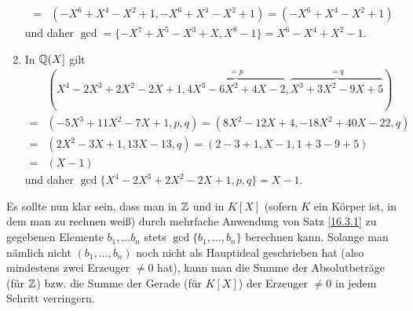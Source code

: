 \documentclass[../../main.tex]{subfiles}
\begin{document}
\begin{bsp}
\begin{enumerate}[\normalfont(a)]
\begin{align*}
=&(-X^6+X^4-X^2+1,-X^6+X^4-X^2+1)=(-X^6+X^4-X^2+1)
\end{align*}
und daher $\gcd=\{-X^7+X^5-X^3+X,X^8-1\}=X^6-X^4+X^2-1$.
\item In $\mathbb Q(X]$ gilt
\begin{align*}
&(X^4-2X^3+2X^2-2X+1,\overbrace{4X^3-6X^2+4X-2}^{=p},\overbrace{X^3+3X^2-9X+5}^{=q})\\
=&(-5X^3+11X^2-7X+1,p,q)=(8X^2-12X+4, -18X^2+40X-22,q)\\
=&(2X^2-3X+1,13X-13,q)=(2-3+1,X-1,1+3-9+5)\\
=&(X-1)
\end{align*}
und daher $\gcd\{X^4-2X^3+2X^2-2X+1,p,q\}=X-1$.
\end{enumerate}
\end{bsp}

\noindent Es sollte nun klar sein, dass man in $\mathbb Z$ und in $K[X]$ (sofern $K$ ein Körper ist, in dem man zu rechnen weiß) durch mehrfache Anwendung von Satz \ref{16.3.1} zu gegebenen Elemente $b_1,...b_n$ stets $\gcd\{b_1,...,b_n\}$ berechnen kann. Solange man nämlich nicht $(b_1,...,b_n)$ noch nicht als Hauptideal geschrieben hat (also mindestens zwei Erzeuger $\neq 0$ hat), kann man die Summe der Absolutbeträge (für $\mathbb Z$) bzw. die Summe der Gerade (für $K[X]$) der Erzeuger $\neq 0$ in jedem Schritt verringern.\\
\end{document}
